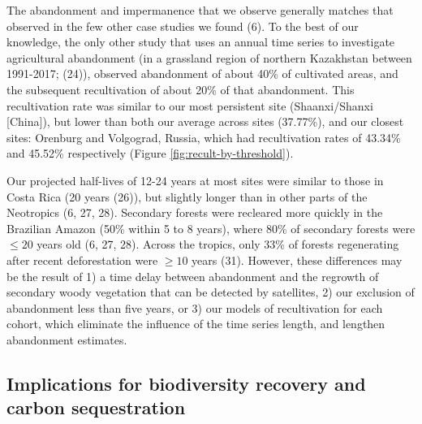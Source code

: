 \documentclass[9pt,twocolumn,twoside,lineno]{pnas-new}
\begin{document}
The abandonment and impermanence that we observe generally matches that observed in the few other case studies we found (6).
To the best of our knowledge, the only other study that uses an annual time series to investigate agricultural abandonment (in a grassland region of northern Kazakhstan between 1991-2017; (24)), observed abandonment of about 40\% of cultivated areas, and the subsequent recultivation of about 20\% of that abandonment.
This recultivation rate was similar to our most persistent site (Shaanxi/Shanxi {[}China{]}), but lower than both our average across sites (37.77\%), and our closest sites: Orenburg and Volgograd, Russia, which had recultivation rates of 43.34\% and 45.52\% respectively (Figure \ref{fig:recult-by-threshold}).

Our projected half-lives of 12-24 years at most sites were similar to those in Costa Rica (20 years (26)), but slightly longer than in other parts of the Neotropics (6, 27, 28).
Secondary forests were recleared more quickly in the Brazilian Amazon (50\% within 5 to 8 years), where 80\% of secondary forests were \(\leq20\) years old (6, 27, 28).
Across the tropics, only 33\% of forests regenerating after recent deforestation were \(\geq10\) years (31).
However, these differences may be the result of 1) a time delay between abandonment and the regrowth of secondary woody vegetation that can be detected by satellites, 2) our exclusion of abandonment less than five years, or 3) our models of recultivation for each cohort, which eliminate the influence of the time series length, and lengthen abandonment estimates.

\hypertarget{implications-for-biodiversity-recovery-and-carbon-sequestration}{%
\subsection{Implications for biodiversity recovery and carbon sequestration}\label{implications-for-biodiversity-recovery-and-carbon-sequestration}}
\end{document}

